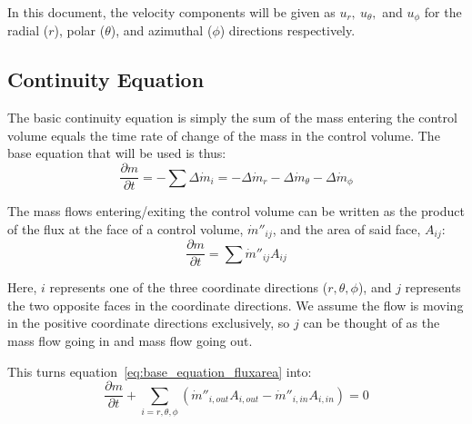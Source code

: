 \documentclass[12pt, letterpaper, twoside]{article}
\begin{document}
    In this document, the velocity components will be given as \(u_r,\ u_{\theta},\) and \(u_{\phi}\) for the radial (\(r\)), polar (\(\theta\)), and azimuthal (\(\phi\)) directions respectively.

\subsection{Continuity Equation}
    The basic continuity equation is simply the sum of the mass entering the control volume equals the time rate of change of the mass in the control volume. The base equation that will be used is thus:
    \begin{equation}\label{eq:base_equation_orig}
        \frac{\partial m}{\partial t} = - \sum \Delta\dot{m}_i = -\Delta\dot{m}_r - \Delta\dot{m}_{\theta} - \Delta\dot{m}_{\phi} 
    \end{equation}

    The mass flows entering/exiting the control volume can be written as the product of the flux at the face of a control volume, \(\dot{m}''_{ij}\), and the area of said face, \(A_{ij}\):
    \begin{equation}\label{eq:base_equation_fluxarea}
        \frac{\partial m}{\partial t} = \sum \dot{m}''_{ij} A_{ij}
    \end{equation}

    Here, \(i\) represents one of the three coordinate directions (\(r, \theta, \phi\)), and \(j\) represents the two opposite faces in the coordinate directions. We assume the flow is moving in the positive coordinate directions exclusively, so \(j\) can be thought of as the mass flow going in and mass flow going out.

    This turns equation~\ref{eq:base_equation_fluxarea} into:
    \begin{equation}\label{eq:base_equation_full}
        \frac{\partial m}{\partial t} + 
        \sum_{i=r, \theta, \phi}
        (\dot{m}''_{i,out} A_{i,out} - \dot{m}''_{i,in} A_{i,in}) = 0 
    \end{equation}

\end{document}

